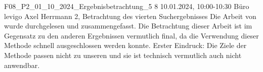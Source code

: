 \fieldnote
{F08\_P2\_01\_10\_2024\_Ergebnisbetrachtung\_5}
{8}
{10.01.2024, 10:00-10:30}
{Büro levigo}
{Axel Herrmann}
{2, Betrachtung des vierten Suchergebnisses}
{
  Die Arbeit von  wurde durchgelesen und zusammengefasst.
}
{
  Die Betrachtung dieser Arbeit ist im Gegensatz zu den anderen Ergebnissen vermutlich final, da die Verwendung dieser Methode schnell ausgeschlossen werden konnte.
}
{
}
{
  Erster Eindruck: Die Ziele der Methode passen nicht zu unseren und sie ist technisch vermutlich auch nicht anwendbar.
}
{
}
